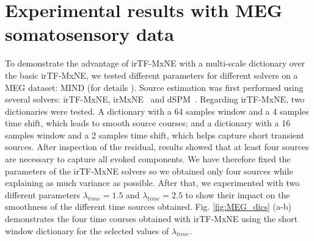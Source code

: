 \section{Experimental results with MEG somatosensory data}
To demonstrate the advantage of irTF-MxNE with a multi-scale dictionary over the basic irTF-MxNE, we tested different parameters for different solvers on a MEG dataset: MIND (for details \cite{weisend2007paving}).
Source estimation was first performed using several solvers: irTF-MxNE, irMxNE~\cite{strohmeier2014iterative} and dSPM~\cite{dale2000dynamic}. Regarding irTF-MxNE, two dictionaries were tested. A dictionary with a 64 samples window and a 4 samples time shift, which leads to smooth source courses; and a dictionary with a 16 samples window and a 2 samples time shift, which helps capture short transient sources. After inspection of the residual, results showed that at least four sources are necessary to capture all evoked components. We have therefore fixed the parameters of the irTF-MxNE solvers so we obtained only four sources while explaining as much variance as possible. After that, we experimented with two different parameters $\lambda_{time}=1.5$ and $\lambda_{time}=2.5$ to show their impact on the smoothness of the different time sources obtained.
Fig. \ref{fig:MEG_dics} (a-b) demonstrates the four time courses obtained with irTF-MxNE using the short window dictionary for the selected values of $\lambda_{time}$.

